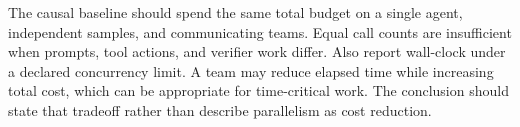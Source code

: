 The causal baseline should spend the same total budget on a single agent, independent samples, and communicating teams. Equal call counts are insufficient when prompts, tool actions, and verifier work differ. Also report wall-clock under a declared concurrency limit. A team may reduce elapsed time while increasing total cost, which can be appropriate for time-critical work. The conclusion should state that tradeoff rather than describe parallelism as cost reduction.

